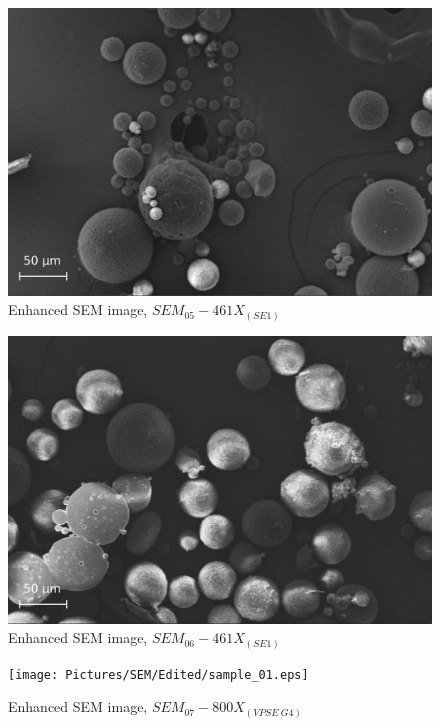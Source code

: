 \documentclass{article}
\begin{document}
          \begin{figure}[h!]
              \centering 
              \includegraphics[width=\textwidth]{Pictures/SEM/Edited/06_01.eps}
              \caption{Enhanced SEM image, $SEM_{05}-461X_{(SE1)}$ \autocites{Pixelmator_Pro}{GIMP}}
              \label{fig:SEM_05}
          \end{figure}
      
          \begin{figure}[h!]
              \centering 
              \includegraphics[width=\textwidth]{Pictures/SEM/Edited/06_03.eps}
              \caption{Enhanced SEM image, $SEM_{06}-461X_{(SE1)}$ \autocites{Pixelmator_Pro}{GIMP}}
              \label{fig:SEM_06}
          \end{figure}
      
          \begin{figure}[h!]
              \centering 
              \texttt{[image: Pictures/SEM/Edited/sample\_01.eps]}
              \caption{Enhanced SEM image, $SEM_{07}-800X_{(VPSE \ G4)}$ \autocites{Pixelmator_Pro}{GIMP}}
              \label{fig:SEM_07}
          \end{figure}
      
\end{document}
